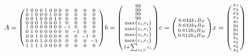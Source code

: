 \documentclass{article}
\begin{document}
\begin{align*}
A = \begin{psmallmatrix}
        1 & 0 & 0 & 0 & 1 & 0 & 0 & 0 & 0 & 0 & 0 & 0 \\
        0 & 1 & 0 & 0 & 0 & 1 & 0 & 0 & 0 & 0 & 0 & 0 \\
        0 & 0 & 1 & 0 & 0 & 0 & 1 & 0 & 0 & 0 & 0 & 0 \\
        0 & 0 & 0 & 1 & 0 & 0 & 0 & 1 & 0 & 0 & 0 & 0 \\
        1 & 0 & 0 & 0 & 0 & 0 & 0 & 0 & -1 & 0 & 0 & 0 \\
        0 & 1 & 0 & 0 & 0 & 0 & 0 & 0 & 0 & -1 & 0 & 0 \\
        0 & 0 & 1 & 0 & 0 & 0 & 0 & 0 & 0 & 0 & -1 & 0 \\
        0 & 0 & 0 & 1 & 0 & 0 & 0 & 0 & 0 & 0 & 0 & -1 \\
        1 & 1 & 1 & 1 & 0 & 0 & 0 & 0 & 0 & 0 & 0 & 0 
    \end{psmallmatrix}
b = \begin{psmallmatrix}
    99\\99\\99\\99\\ \max\{c_i, r_i\}\\ \max\{c_i, r_i\} \\ \max\{c_i, r_i\} \\ \max\{c_i, r_i\} \\ l + \sum_{i \in S} c_i
\end{psmallmatrix}
c = 
\begin{psmallmatrix}
    0.642 k_1 B_P \\
    0.642 k_2 B_P  \\
    0.612 k_3 B_M \\
    0.612 k_4 B_M
\end{psmallmatrix}
x = \begin{psmallmatrix}
    x_1 \\
    x_2 \\
    x_3 \\
    x_4 \\
    y_1 \\
    y_2 \\
    y_3 \\
    y_4 \\
    s_1 \\
    s_2 \\
    s_3 \\
    s_4
\end{psmallmatrix}
\end{align*}
\printbibliography[heading=bibintoc, title={Bibliography}]
\end{document}
